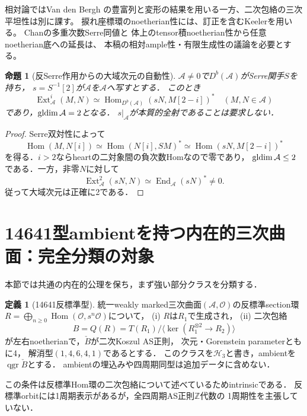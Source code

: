 \documentclass[11pt,a4paper]{ltjsarticle}
\newtheorem{proposition}[theorem]{命題}
\theoremstyle{definition}\newtheorem{definition}[theorem]{定義}
\newcommand{\OO}{\mathcal O}\newcommand{\cA}{\mathcal A}
\newcommand{\End}{\operatorname{End}}\newcommand{\Hom}{\operatorname{Hom}}\newcommand{\Ext}{\operatorname{Ext}}
\newcommand{\qgr}{\operatorname{qgr}}\newcommand{\Gr}{\operatorname{Gr}}
\begin{document}
相対論ではVan den Bergh\cite[Theorem 4.2, Propositions 5.1, 5.3]{VdBFormalAbelian}
の豊富列と変形の結果を用いる一方、二次包絡の三次平坦性は別に課す。
捩れ座標環のnoetherian性には、訂正を含むKeeler\cite{KeelerAmpleFilters}を用いる。
Chan\cite[Theorem 3.4, Corollary 5.8]{ChanTwistedMulti}の多重次数Serre同値と
体上のtensor積noetherian性から任意noetherian底への延長は、
本稿の相対ample性・有限生成性の議論を必要とする。


\begin{proposition}[反Serre作用からの大域次元の自動性]
\label{prop:serre-heart-global-dimension}
$\cA\ne0$で$D^b(\cA)$がSerre関手$S$を持ち，
$s=S^{-1}[2]$が$\cA$を$\cA$へ写すとする．
このとき
\[
\Ext^i_{\cA}(M,N)\simeq
\Hom_{D^b(\cA)}(sN,M[2-i])^*
\quad(M,N\in\cA)
\]
であり，$\gldim\cA=2$となる．
$s|_{\cA}$が本質的全射であることは要求しない．
\end{proposition}
\begin{proof}
Serre双対性によって
\[
\Hom(M,N[i])\simeq\Hom(N[i],SM)^*
\simeq\Hom(sN,M[2-i])^*
\]
を得る．$i>2$ならheartの二対象間の負次数Homなので零であり，
$\gldim\cA\le2$である．一方，非零$N$に対して
\[
\Ext^2_{\cA}(sN,N)\simeq\End_{\cA}(sN)^*\ne0.
\]
従って大域次元は正確に2である．
\end{proof}

\section{14641型ambientを持つ内在的三次曲面：完全分類の対象}
\label{sec:14641-classification}
本節では共通の内在的公理を保ち，まず強い部分クラスを分類する．
\begin{definition}[14641反標準型]\label{def:14641-intrinsic}
統一weakly marked三次曲面$(\cA,\OO)$の反標準section環
$R=\bigoplus_{n\ge0}\Hom(\OO,s^n\OO)$について，
(i) $R$は$R_1$で生成され，
(ii) 二次包絡
\[
 B=Q(R)=T(R_1)/\langle\ker(R_1^{\otimes2}\to R_2)\rangle
\]
が左右noetherianで，$\check B$が二次Koszul AS正則，
次元・Gorenstein parameterともに4，
解消型$(1,4,6,4,1)$であるとする．
このクラスを$\mathcal H_3$と書き，ambientを$\qgr\check B$とする．
ambientの埋込みや四周期同型は追加データに含めない．
\end{definition}
この条件は反標準Hom環の二次包絡について述べているためintrinsicである．
反標準orbitには1周期表示があるが，全四周期AS正則$\mathbb Z$代数の
1周期性を主張していない．
\end{document}
